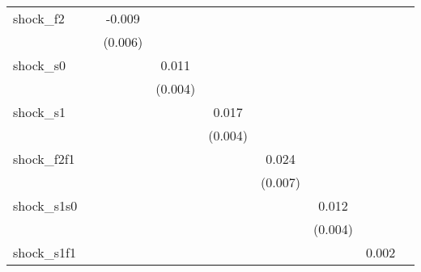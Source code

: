 {\begin{tabular}{l*{8}{c}}
\addlinespace
shock\_f2    &                     &      -0.009         &                     &                     &                     &                     &                     &                     \\
            &                     &     (0.006)         &                     &                     &                     &                     &                     &                     \\
\addlinespace
shock\_s0    &                     &                     &       0.011\sym{**} &                     &                     &                     &                     &                     \\
            &                     &                     &     (0.004)         &                     &                     &                     &                     &                     \\
\addlinespace
shock\_s1    &                     &                     &                     &       0.017\sym{***}&                     &                     &                     &                     \\
            &                     &                     &                     &     (0.004)         &                     &                     &                     &                     \\
\addlinespace
shock\_f2f1  &                     &                     &                     &                     &       0.024\sym{***}&                     &                     &                     \\
            &                     &                     &                     &                     &     (0.007)         &                     &                     &                     \\
\addlinespace
shock\_s1s0  &                     &                     &                     &                     &                     &       0.012\sym{***}&                     &                     \\
            &                     &                     &                     &                     &                     &     (0.004)         &                     &                     \\
\addlinespace
shock\_s1f1  &                     &                     &                     &                     &                     &                     &       0.002         &                     \\

\end{tabular}}
